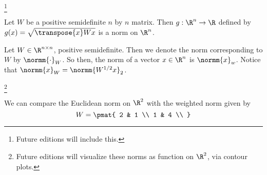 
\footnote{Future editions will include this.}


\begin{proposition}
Let $W$ be a positive semidefinite $n$ by $n$ matrix.
Then $g: \R^n \to \R$ defined by $g(x) = \sqrt{\transpose{x}Wx}$ is a norm on $\R^n$.
\end{proposition}


Let $W \in \R^{n \times n}$, positive semidefinite.
Then we denote the norm corresponding to $W$ by $\normm{\cdot}_{W}$.
So then, the norm of a vector $x \in \R^n$ is $\normm{x}_{w}$.
Notice that $\normm{x}_{W} = \normm{W^{1/2}x}_2$.

\footnote{Future editions will visualize these norms as function on $\R^2$, via contour plots.}

We can compare the Euclidean norm on $\R^2$ with the weighted norm given by
\[
  W = \pmat{
    2 & 1 \\
    1 & 4 \\
  }
\]

\blankpage
